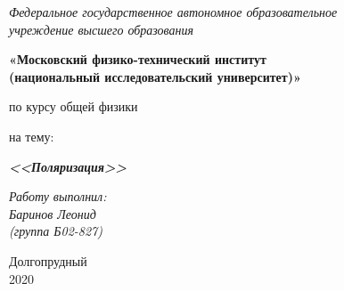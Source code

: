 \thispagestyle{empty}
\begin{center}
    \textit{Федеральное государственное автономное образовательное\\ учреждение высшего образования }

    \vspace{0.5ex}

        \textbf{«Московский физико-технический институт\\ (национальный исследовательский университет)»}
\end{center}

\vspace{10ex}

\begin{center}
    \vspace{13ex}


    \vspace{1ex}

    по курсу общей физики

    на тему:

    \textbf{\textit{<<Поляризация>>}}

    \vspace{30ex}

    \begin{flushright}
        \noindent
        \textit{Работу выполнил:}\\  
        \textit{Баринов Леонид \\(группа Б02-827)}
    \end{flushright}
    \vfill
    Долгопрудный \\2020
\newpage
\setcounter{page}{1}
\fancyhead[R]{\nouppercase{\leftmark}}	
\end{center}
